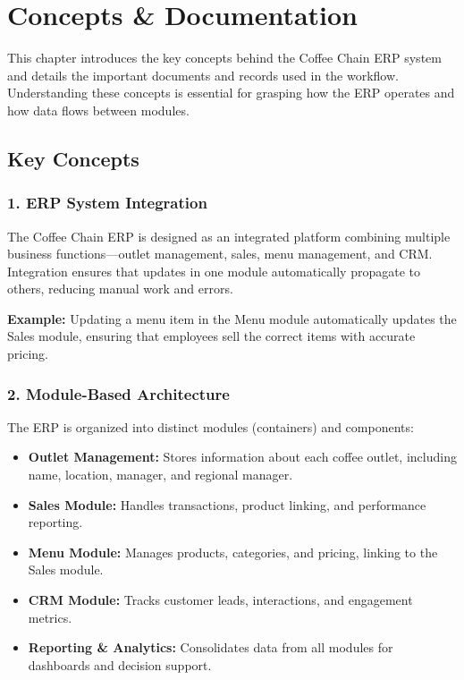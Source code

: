 \chapter{Concepts \& Documentation}

This chapter introduces the key concepts behind the Coffee Chain ERP system and details the important documents and records used in the workflow. Understanding these concepts is essential for grasping how the ERP operates and how data flows between modules.

\section*{Key Concepts}

\subsection*{1. ERP System Integration}
The Coffee Chain ERP is designed as an integrated platform combining multiple business functions—outlet management, sales, menu management, and CRM. Integration ensures that updates in one module automatically propagate to others, reducing manual work and errors.  

\textbf{Example:} Updating a menu item in the Menu module automatically updates the Sales module, ensuring that employees sell the correct items with accurate pricing.

\subsection*{2. Module-Based Architecture}
The ERP is organized into distinct modules (containers) and components:

\begin{itemize}
    \item \textbf{Outlet Management:} Stores information about each coffee outlet, including name, location, manager, and regional manager.
    \item \textbf{Sales Module:} Handles transactions, product linking, and performance reporting.
    \item \textbf{Menu Module:} Manages products, categories, and pricing, linking to the Sales module.
    \item \textbf{CRM Module:} Tracks customer leads, interactions, and engagement metrics.
    \item \textbf{Reporting \& Analytics:} Consolidates data from all modules for dashboards and decision support.
\end{itemize}

